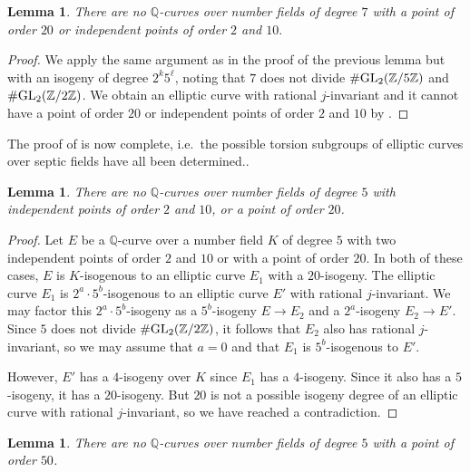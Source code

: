 \documentclass[10pt,leqno]{amsart}
\newcommand{\Z}{\mathbb{Z}}
\newcommand{\Q}{\mathbb{Q}}
\newcommand{\GL}{\textnormal{GL}}
\newtheorem{lemma}[theorem]{Lemma}
\theoremstyle{definition}
\theoremstyle{remark}
\numberwithin{theorem}{section}
\begin{document}
\begin{lemma}
    There are no $\Q$-curves over number fields of degree $7$ with a point of order $20$ or independent points of order $2$ and $10.$
\end{lemma}
\begin{proof}
    We apply the same argument as in the proof of the previous lemma but with an isogeny of degree $2^k5^\ell$, noting that $7$ does not divide $\#\GL_2(\Z/5\Z)$ and $\#\GL_2(\Z/2\Z)$. We obtain an elliptic curve with rational $j$-invariant and it cannot have a point of order $20$ or independent points of order $2$ and $10$ by \cite[Theorem 5.1.2]{guzvic2021torsion}. 
\end{proof}

The proof of  is now complete, i.e.\ the possible torsion subgroups of elliptic curves over septic fields have all been determined.. 

\begin{lemma}
    There are no $\Q$-curves over number fields of degree $5$ with independent points of order $2$ and $10$, or a point of order $20$. 
\end{lemma}
\begin{proof}
   Let $E$ be a $\Q$-curve over a number field $K$ of degree $5$ with two independent points of order $2$ and $10$ or with a point of order $20$. In both of these cases, $E$ is $K$-isogenous to an elliptic curve $E_1$ with a $20$-isogeny. The elliptic curve $E_1$ is $2^a \cdot 5^b$-isogenous to an elliptic curve $E'$ with rational $j$-invariant. We may factor this $2^a\cdot 5^b$-isogeny as a $5^b$-isogeny $E\to E_2$ and a $2^a$-isogeny $E_2 \to E'$. Since $5$ does not divide $\#\GL_2(\Z/2\Z)$, it follows that $E_2$ also has rational $j$-invariant, so we may assume that $a=0$ and that $E_1$ is $5^b$-isogenous to $E'$.

    However, $E'$ has a $4$-isogeny over $K$ since $E_1$ has a $4$-isogeny. Since it also has a $5$-isogeny, it has a $20$-isogeny. But $20$ is not a possible isogeny degree of an elliptic curve with rational $j$-invariant, so we have reached a contradiction. 
\end{proof}
\begin{lemma}
    There are no $\Q$-curves over number fields of degree $5$ with a point of order $50$.
\end{lemma}
\end{document}
